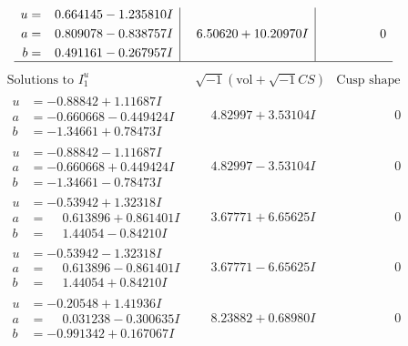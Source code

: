 \documentclass[1p]{elsarticle_modified}
\theoremstyle{definition}
\newcommand{\I}{\sqrt{-1}}
\begin{document}
$$\begin{array}{c|c|c}
\begin{aligned}
u &= \phantom{-}0.664145 - 1.235810 I \\
a &= \phantom{-}0.809078 - 0.838757 I \\
b &= \phantom{-}0.491161 - 0.267957 I\end{aligned}
 & \phantom{-}6.50620 + 10.20970 I & \phantom{-0.000000 } 0\\
 \hline 
 \end{array}$$\newpage$$\begin{array}{c|c|c}  
\text{Solutions to }I^u_{1}& \I (\text{vol} + \sqrt{-1}CS) & \text{Cusp shape}\\
 \hline 
\begin{aligned}
u &= -0.88842 + 1.11687 I \\
a &= -0.660668 - 0.449424 I \\
b &= -1.34661 + 0.78473 I\end{aligned}
 & \phantom{-}4.82997 + 3.53104 I & \phantom{-0.000000 } 0 \\ \hline\begin{aligned}
u &= -0.88842 - 1.11687 I \\
a &= -0.660668 + 0.449424 I \\
b &= -1.34661 - 0.78473 I\end{aligned}
 & \phantom{-}4.82997 - 3.53104 I & \phantom{-0.000000 } 0 \\ \hline\begin{aligned}
u &= -0.53942 + 1.32318 I \\
a &= \phantom{-}0.613896 + 0.861401 I \\
b &= \phantom{-}1.44054 - 0.84210 I\end{aligned}
 & \phantom{-}3.67771 + 6.65625 I & \phantom{-0.000000 } 0 \\ \hline\begin{aligned}
u &= -0.53942 - 1.32318 I \\
a &= \phantom{-}0.613896 - 0.861401 I \\
b &= \phantom{-}1.44054 + 0.84210 I\end{aligned}
 & \phantom{-}3.67771 - 6.65625 I & \phantom{-0.000000 } 0 \\ \hline\begin{aligned}
u &= -0.20548 + 1.41936 I \\
a &= \phantom{-}0.031238 - 0.300635 I \\
b &= -0.991342 + 0.167067 I\end{aligned}
 & \phantom{-}8.23882 + 0.68980 I & \phantom{-0.000000 } 0 \\ \hline\begin{aligned}

\end{aligned}
\end{array}$$
\end{document}
